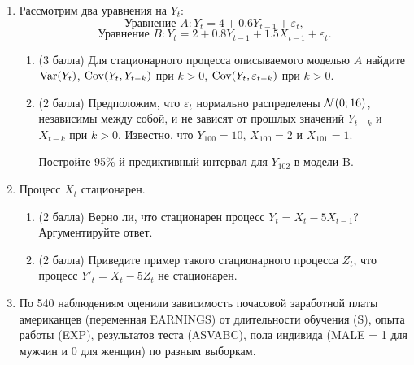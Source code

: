 \begin{enumerate}
    \item 
    Рассмотрим два уравнения на $Y_t$: 
    \[
    \text{Уравнение } A: Y_t=4 + 0.6 Y_{t-1} + \varepsilon_t,
    \]
    \[
    \text{Уравнение } B: Y_t=2 + 0.8 Y_{t-1}+1.5 X_{t-1} + \varepsilon_t.
    \]
    
    \begin{enumerate}
        \item (3 балла) Для стационарного процесса описываемого моделью $A$ найдите 
        $\operatorname{Var}(Y_t)$, $\operatorname{Cov}(Y_t, Y_{t-k})$ при $k>0$, $\operatorname{Cov}(Y_t, \varepsilon_{t-k})$ при $k>0$.
        \item (2 балла) Предположим, что $\varepsilon_t$ нормально распределены $\mathcal{N}(0;16)$, независимы между собой, и не зависят от прошлых значений $Y_{t-k}$ и $X_{t-k}$ при $k>0$. Известно, что $Y_{100}=10$, $X_{100} = 2$ и $X_{101}=1$.
        
        Постройте 95\%-й предиктивный интервал для $Y_{102}$ в модели B. 
    \end{enumerate}
    

    \item  
    Процесс $X_t$ стационарен.
    \begin{enumerate}
        \item (2 балла) Верно ли, что стационарен процесс $Y_t = X_t - 5X_{t-1}$? Аргументируйте ответ. 
        
        \item (2 балла) Приведите пример такого стационарного процесса $Z_t$, что процесс $Y'_t = X_t - 5Z_t$ не стационарен. 
        
    \end{enumerate}
    
    \item  
    По 540 наблюдениям оценили зависимость почасовой заработной
    платы американцев (переменная EARNINGS) от длительности обучения (S), опыта работы (EXP), результатов теста (ASVABC), пола индивида (MALE = 1 для мужчин и 0 для женщин) по разным выборкам.


\end{enumerate}
